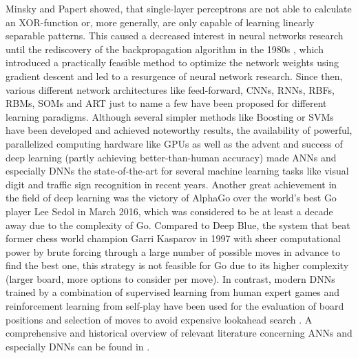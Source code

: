 Minsky and Papert \cite{Minsky1969} showed, that single-layer perceptrons are not able to calculate an XOR-function or, more generally, are only capable of learning linearly separable patterns.
This caused a decreased interest in neural networks research until the rediscovery of the backpropagation algorithm \cite{Werbos1974} in the 1980s \cite{Rumelhart1986}, which introduced a practically feasible method to optimize the network weights using gradient descent and led to a resurgence of neural network research.
Since then, various different network architectures like feed-forward, \acp{CNN}, \acp{RNN}, \acp{RBF}, \acp{RBM}, \acp{SOM} and \ac{ART} just to name a few \cite{Schmidhuber2015} have been proposed for different learning paradigms.
Although several simpler methods like Boosting \cite{Freund1997} or \acp{SVM} \cite{Vapnik1995} have been developed and achieved noteworthy results, the availability of powerful, parallelized computing hardware like \acp{GPU} as well as the advent and success  of deep learning (partly achieving better-than-human accuracy) made \acp{ANN} \cite{Rojas1996} and especially \acp{DNN} \cite{LeCun2015} the state-of-the-art for several machine learning tasks like visual digit \cite{Ciresan2012a} and traffic sign \cite{Ciresan2012} recognition in recent years.
Another great achievement in the field of deep learning was the victory of AlphaGo \cite{Silver2016} over the world's best Go player Lee Sedol in March 2016, which was considered to be at least a decade away due to the complexity of Go.
Compared to Deep Blue, the system that beat former chess world champion Garri Kasparov in 1997 \cite{Hsu2002} with sheer computational power by brute forcing through a large number of possible moves in advance to find the best one, this strategy is not feasible for Go due to its higher complexity (larger board, more options to consider per move).
In contrast, modern \acp{DNN} trained by a combination of supervised learning from human expert games and reinforcement learning from self-play have been used for the evaluation of board positions and selection of moves to avoid expensive lookahead search \cite{Silver2016}.
A comprehensive and historical overview of relevant literature concerning \acp{ANN} and especially \acp{DNN} can be found in \cite{Schmidhuber2015, LeCun2015}.

